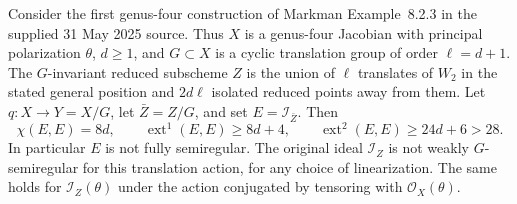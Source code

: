 \begin{proposition}
\label{prop:semireg-markman-genus-four-points}
Consider the first genus-four construction of Markman
Example~8.2.3 in the supplied 31 May 2025 source. Thus $X$ is
a genus-four Jacobian with principal polarization $\theta$,
$d\ge1$, and $G\subset X$ is a cyclic translation group of
order $\ell=d+1$. The $G$-invariant reduced subscheme $Z$ is
the union of $\ell$ translates of $W_2$ in the stated general
position and $2d\ell$ isolated reduced points away from them.
Let $q:X\to Y=X/G$, let $\bar Z=Z/G$, and set
$E=\mathcal I_{\bar Z}$. Then
\[
 \chi(E,E)=8d,\qquad
 \operatorname{ext}^1(E,E)\ge8d+4,\qquad
 \operatorname{ext}^2(E,E)\ge24d+6>28.
 \tag{S19.1}
\]
In particular $E$ is not fully semiregular. The original ideal
$\mathcal I_Z$ is not weakly $G$-semiregular for this translation
action, for any choice of linearization. The same holds for
$\mathcal I_Z(\theta)$ under the action conjugated by tensoring
with $\mathcal O_X(\theta)$.
\end{proposition}
